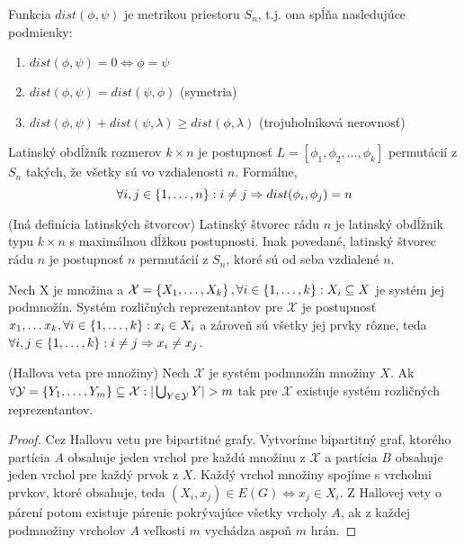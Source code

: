 \begin{theorem}
    Funkcia $dist(\phi, \psi)$ je metrikou priestoru $S_n$, t.j. ona spĺňa nasledujúce podmienky:
    \begin{enumerate}
        \item $dist(\phi, \psi) = 0 \Leftrightarrow \phi = \psi$
        \item $dist(\phi, \psi) = dist(\psi, \phi)$ (symetria)
        \item $dist(\phi, \psi) + dist(\psi, \lambda) \geq dist(\phi, \lambda)$ (trojuholníková nerovnosť)  
    \end{enumerate}
\end{theorem}

\begin{definition}
Latinský obdĺžník rozmerov $k \times n$ je postupnosť $L = [\phi_1, \phi_2, \ldots, \phi_k]$ permutácií z $S_n$ takých,
že všetky sú vo vzdialenosti $n$. Formálne, 
$$\forall i, j \in \left\{1, \ldots, n\right\}: i \neq j \Rightarrow dist(\phi_i, \phi_j) = n$$
\end{definition}

\begin{definition}{(Iná definícia latinských štvorcov)}
Latinský štvorec rádu $n$ je latinský obdĺžnik typu $k \times n$ s maximálnou dĺžkou postupnosti. Inak povedané,
latinský štvorec rádu $n$ je postupnosť $n$ permutácií z $S_n$, ktoré sú od seba vzdialené $n$.
\end{definition}

\begin{definition}
    Nech X je množina a $\mathcal{X} = \left\{X_1, \ldots, X_k\right\}, \forall i \in \left\{1, \ldots, k\right\}: X_i \subseteq X$ je systém jej podmnožín.
    Systém rozličných reprezentantov pre $\mathcal{X}$ je postupnosť $x_1, \ldots x_k, \forall i \in \left\{1, \ldots, k\right\}: x_i \in X_i$ 
    a zároveň sú všetky jej prvky rôzne, teda $\forall i, j \in \left\{1, \ldots, k\right\}: i \neq j \Rightarrow  x_i \neq x_j$.
\end{definition}

\begin{theorem}{(Hallova veta pre množiny)}
    Nech $\mathcal{X}$ je systém podmnožín množiny $X$. 
    Ak $\forall \mathcal{Y} = \left\{Y_1, \ldots, Y_m\right\} \subseteq \mathcal{X}: |\bigcup_{Y \in \mathcal{Y}} Y| > m$ tak pre 
    $\mathcal{X}$ existuje systém rozličných reprezentantov.
\end{theorem}
\begin{proof}
Cez Hallovu vetu pre bipartitné grafy. 
Vytvoríme bipartitný graf, ktorého partícia $A$ obsahuje jeden vrchol pre každú množinu 
z $\mathcal{X}$ a partícia $B$ obsahuje jeden vrchol pre každý prvok z $X$. Každý vrchol množiny spojíme s vrcholmi prvkov, 
ktoré obsahuje, teda $(X_i, x_j) \in E(G) \Leftrightarrow x_j \in X_i$. 
Z Hallovej vety o párení potom existuje párenie pokrývajúce všetky vrcholy $A$,
ak z každej podmnožiny vrcholov $A$ veľkosti $m$ vychádza aspoň $m$ hrán.  
\end{proof}

